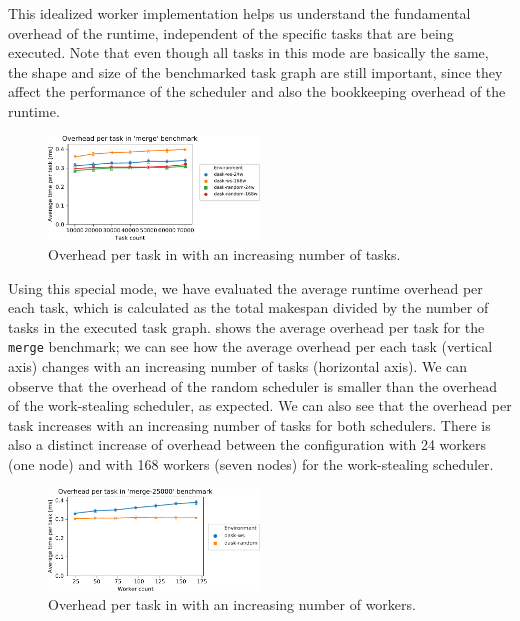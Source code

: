 This idealized worker implementation helps us understand the fundamental overhead of the
\dask{} runtime, independent of the specific tasks that are being executed.
Note that even though all tasks in this mode are basically the same, the shape and size of the
benchmarked task graph are still important, since they affect the performance of the scheduler and
also the bookkeeping overhead of the runtime.

\begin{figure}
	\centering
	\includegraphics[width=0.5\textwidth]{imgs/rsds/charts/dask-merge-task-scaling}
	\caption{Overhead per task in \dask{} with an increasing number of tasks.}
	\label{fig:dask-merge-task-scaling}
\end{figure}

Using this special mode, we have evaluated the average runtime overhead per each task, which is
calculated as the total makespan divided by the number of tasks in the executed task graph.
 shows the average overhead per task for the \texttt{merge}
benchmark; we can see how the average overhead per each task (vertical axis) changes with an
increasing number of tasks (horizontal axis). We can observe that the overhead of the random
scheduler is smaller than the overhead of the work-stealing scheduler, as expected. We can also see
that the overhead per task increases with an increasing number of tasks for both schedulers. There
is also a distinct increase of overhead between the configuration with \num{24}
workers (one node) and with \num{168} workers (seven nodes) for the work-stealing
scheduler.

\begin{figure}
	\centering
	\includegraphics[width=0.5\textwidth]{imgs/rsds/charts/dask-merge-worker-scaling}
	\caption{Overhead per task in \dask{} with an increasing number of workers.}
	\label{fig:dask-merge-worker-scaling}
\end{figure}


